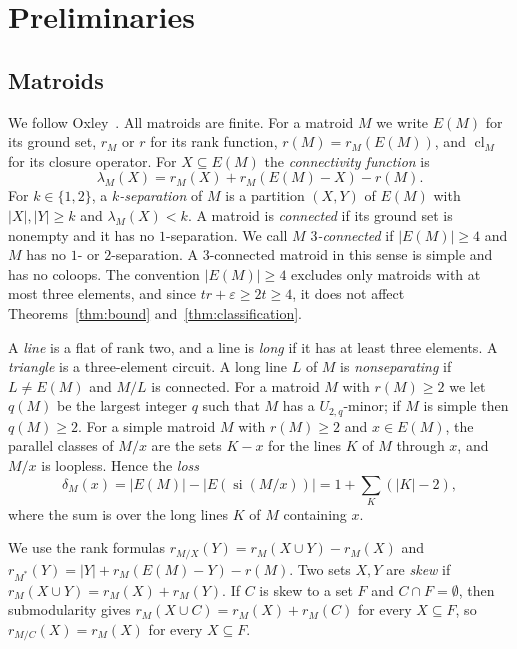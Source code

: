 \documentclass[11pt]{amsart}
\theoremstyle{definition}
\theoremstyle{remark}
\numberwithin{equation}{section}
\newcommand{\cl}{\operatorname{cl}}
\newcommand{\si}{\operatorname{si}}
\newcommand{\lam}{\lambda}
\begin{document}
\section{Preliminaries}\label{sec:prelim}

\subsection{Matroids}
We follow Oxley~\cite{Oxl11}. All matroids are finite. For a matroid $M$ we write $E(M)$ for its ground set, $r_M$ or $r$ for its rank function, $r(M)=r_M(E(M))$, and $\cl_M$ for its closure operator. For $X\subseteq E(M)$ the \emph{connectivity function} is
\[
\lam_M(X)=r_M(X)+r_M(E(M)-X)-r(M).
\]
For $k\in\{1,2\}$, a \emph{$k$-separation} of $M$ is a partition $(X,Y)$ of $E(M)$ with $|X|,|Y|\ge k$ and $\lam_M(X)<k$. A matroid is \emph{connected} if its ground set is nonempty and it has no $1$-separation. We call $M$ \emph{$3$-connected} if $|E(M)|\ge4$ and $M$ has no $1$- or $2$-separation. A $3$-connected matroid in this sense is simple and has no coloops. The convention $|E(M)|\ge4$ excludes only matroids with at most three elements, and since $tr+\varepsilon\ge 2t\ge4$, it does not affect Theorems~\ref{thm:bound} and~\ref{thm:classification}.

A \emph{line} is a flat of rank two, and a line is \emph{long} if it has at least three elements. A \emph{triangle} is a three-element circuit. A long line $L$ of $M$ is \emph{nonseparating} if $L\ne E(M)$ and $M/L$ is connected. For a matroid $M$ with $r(M)\ge2$ we let $q(M)$ be the largest integer $q$ such that $M$ has a $U_{2,q}$-minor; if $M$ is simple then $q(M)\ge2$. For a simple matroid $M$ with $r(M)\ge2$ and $x\in E(M)$, the parallel classes of $M/x$ are the sets $K-x$ for the lines $K$ of $M$ through $x$, and $M/x$ is loopless. Hence the \emph{loss}
\begin{equation}\label{eq:loss}
\delta_M(x)=|E(M)|-|E(\si(M/x))|=1+\sum_{K}(|K|-2),
\end{equation}
where the sum is over the long lines $K$ of $M$ containing $x$.

We use the rank formulas $r_{M/X}(Y)=r_M(X\cup Y)-r_M(X)$ and $r_{M^*}(Y)=|Y|+r_M(E(M)-Y)-r(M)$. Two sets $X,Y$ are \emph{skew} if $r_M(X\cup Y)=r_M(X)+r_M(Y)$. If $C$ is skew to a set $F$ and $C\cap F=\emptyset$, then submodularity gives $r_M(X\cup C)=r_M(X)+r_M(C)$ for every $X\subseteq F$, so $r_{M/C}(X)=r_M(X)$ for every $X\subseteq F$.
\end{document}
